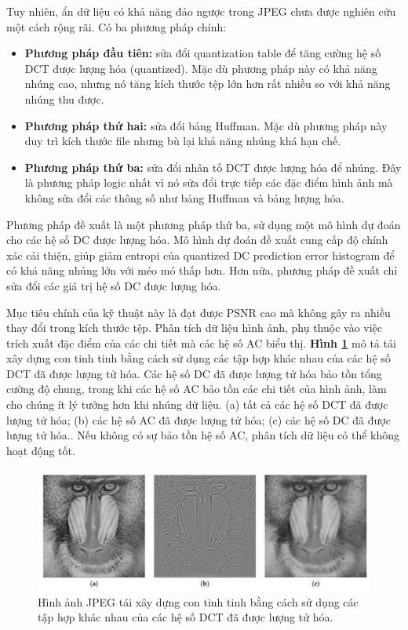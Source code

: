 Tuy nhiên, ẩn dữ liệu có khả năng đảo ngược trong JPEG chưa được nghiên cứu một cách rộng rãi. Có ba phương pháp chính:

\begin{itemize}
    \item \textbf{Phương pháp đầu tiên:} sửa đổi quantization table để tăng cường hệ số DCT được lượng hóa (quantized). Mặc dù phương pháp này có khả năng nhúng cao, nhưng nó tăng kích thước tệp lớn hơn rất nhiều so với khả năng nhúng thu được. 
    \item \textbf{Phương pháp thứ hai:} sửa đổi bảng Huffman. Mặc dù phương pháp này duy trì kích thước file nhưng bù lại khả năng nhúng khá hạn chế. 
    \item \textbf{Phương pháp thứ ba:} sửa đổi nhân tố DCT được lượng hóa để nhúng. Đây là phương pháp logic nhất vì nó sửa đổi trực tiếp các đặc điểm hình ảnh mà không sửa đổi các thông số như bảng Huffman và bảng lượng hóa.
\end{itemize}

Phương pháp đề xuất là một phương pháp thứ ba, sử dụng một mô hình dự đoán cho các hệ số DC được lượng hóa. Mô hình dự đoán đề xuất cung cấp độ chính xác cải thiện, giúp giảm entropi của quantized DC prediction error histogram để có khả năng nhúng lớn với méo mó thấp hơn. Hơn nữa, phương pháp đề xuất chỉ sửa đổi các giá trị hệ số DC được lượng hóa. 

Mục tiêu chính của kỹ thuật này là đạt được PSNR cao mà không gây ra nhiều thay đổi trong kích thước tệp. Phân tích dữ liệu hình ảnh, phụ thuộc vào việc trích xuất đặc điểm của các chi tiết mà các hệ số AC biểu thị. \textbf{Hình \ref{fig:chap2-dc-tinh-tinh}} mô tả tái xây dựng con tinh tinh bằng cách sử dụng các tập hợp khác nhau của các hệ số DCT đã được lượng tử hóa. Các hệ số DC đã được lượng tử hóa bảo tồn tổng cường độ chung, trong khi các hệ số AC bảo tồn các chi tiết của hình ảnh, làm cho chúng ít lý tưởng hơn khi nhúng dữ liệu. (a) tất cả các hệ số DCT đã được lượng tử hóa; (b) các hệ số AC đã được lượng tử hóa; (c) các hệ số DC đã được lượng tử hóa.. Nếu không có sự bảo tồn hệ số AC, phân tích dữ liệu có thể không hoạt động tốt. 
\begin{figure}
    \centering
    \includegraphics[scale=0.7]{graphics/chapter-2/chap2-dc-tinh-tinh.png}
    \caption{Hình ảnh JPEG tái xây dựng con tinh tinh bằng cách sử dụng các tập hợp khác nhau của các hệ số DCT đã được lượng tử hóa. }
    \label{fig:chap2-dc-tinh-tinh}
\end{figure}

